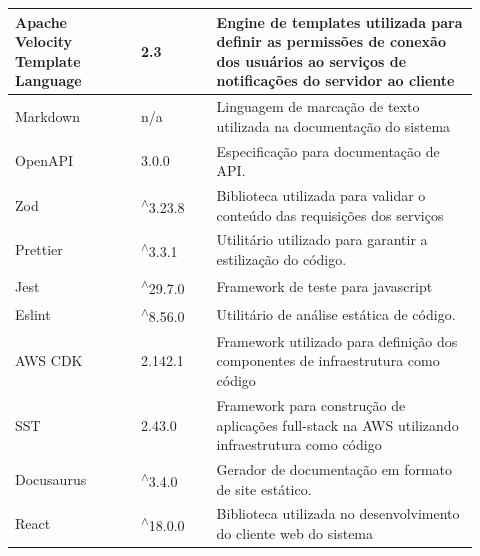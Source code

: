 \begin{longtable}{p{0.25\linewidth} p{0.15\linewidth} p{0.525\linewidth}}
\hline

Apache Velocity Template Language \citep{apachevelocitydocs} & 2.3 & Engine de templates utilizada para definir as permissões de conexão dos usuários ao serviços de notificações do servidor ao cliente \\

\hline

Markdown \citep{markdowndocs} & \gls{n/a} & Linguagem de marcação de texto utilizada na documentação do sistema \\

\hline

OpenAPI \citep{openapidocs} & 3.0.0 & Especificação para documentação de API. \\

\hline

Zod \citep{zoddocs} & \textsuperscript{$\wedge$}3.23.8 & Biblioteca utilizada para validar o conteúdo das requisições dos serviços \\

\hline

Prettier \citep{prettierdocs} & \textsuperscript{$\wedge$}3.3.1 & Utilitário utilizado para garantir a estilização do código. \\

\hline

Jest \citep{jestdocs} & \textsuperscript{$\wedge$}29.7.0 & Framework de teste para javascript \\

\hline

Eslint \citep{eslintdocs} & \textsuperscript{$\wedge$}8.56.0 & Utilitário de análise estática de código. \\

\hline

AWS CDK \citep{awscdkdocs} & 2.142.1 & Framework utilizado para definição dos componentes de infraestrutura como código \\

\hline

SST \citep{sstdocs} & 2.43.0 & Framework para construção de aplicações full-stack na AWS utilizando infraestrutura como código \\

\hline

Docusaurus \citep{docusaurusdocs} & \textsuperscript{$\wedge$}3.4.0 & Gerador de documentação em formato de site estático. \\

\hline

React \citep{reactdocs} & \textsuperscript{$\wedge$}18.0.0 & Biblioteca utilizada no desenvolvimento do cliente web do sistema \\


\end{longtable}
